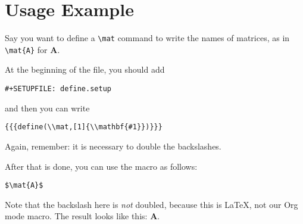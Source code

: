 \documentclass[11pt]{article}
\newcommand{\mat}[1]{\mathbf{#1}}
\begin{document}
\section*{Usage Example}
\label{sec-2}

Say you want to define a \verb~\mat~ command to write the names of
matrices, as in \verb~\mat{A}~ for $\mat{A}$.

At the beginning of the file, you should add
\begin{verbatim}
#+SETUPFILE: define.setup
\end{verbatim}
and then you can write
\begin{verbatim}
{{{define(\\mat,[1]{\\mathbf{#1}})}}}
\end{verbatim}
Again, remember: it is necessary to double the backslashes.  

After that is done, you can use the macro as follows:
\begin{verbatim}
$\mat{A}$
\end{verbatim}
Note that the backslash here is \emph{not} doubled, because this is \LaTeX{},
not our Org mode macro.  The result looks like this: $\mat{A}$.
\end{document}
